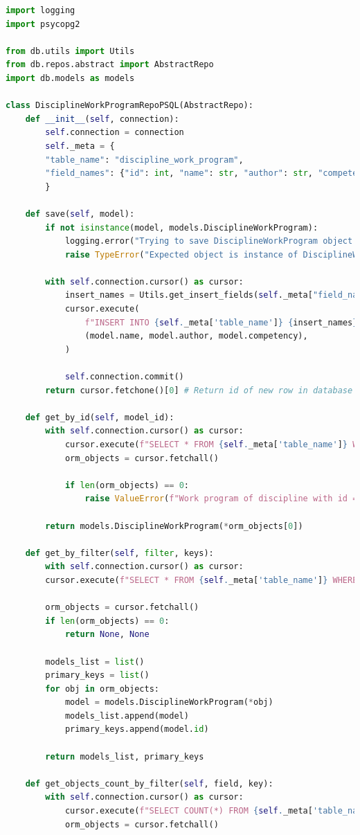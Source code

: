 \begin{lstlisting}[label=lst:db-postgresql, caption=Листинг модуля взаимодействия c СУБД PostgreSQL, language=python]
import logging
import psycopg2

from db.utils import Utils
from db.repos.abstract import AbstractRepo
import db.models as models

class DisciplineWorkProgramRepoPSQL(AbstractRepo):
	def __init__(self, connection):
		self.connection = connection
		self._meta = {
		"table_name": "discipline_work_program",
		"field_names": {"id": int, "name": str, "author": str, "competency": str}
		}
	
	def save(self, model):
		if not isinstance(model, models.DisciplineWorkProgram):
			logging.error("Trying to save DisciplineWorkProgram object of invalid type")
			raise TypeError("Expected object is instance of DisciplineWorkProgram")
	
		with self.connection.cursor() as cursor:
			insert_names = Utils.get_insert_fields(self._meta["field_names"])
			cursor.execute(
				f"INSERT INTO {self._meta['table_name']} {insert_names} VALUES (%s, %s, %s) RETURNING id",
				(model.name, model.author, model.competency),
			)
	
			self.connection.commit()
		return cursor.fetchone()[0] # Return id of new row in database
	
	def get_by_id(self, model_id):
		with self.connection.cursor() as cursor:
			cursor.execute(f"SELECT * FROM {self._meta['table_name']} WHERE id = %s", (model_id,))
			orm_objects = cursor.fetchall()
	
			if len(orm_objects) == 0:
				raise ValueError(f"Work program of discipline with id = {model_id} doesn't exists")
	
		return models.DisciplineWorkProgram(*orm_objects[0])
	
	def get_by_filter(self, filter, keys):
		with self.connection.cursor() as cursor:
		cursor.execute(f"SELECT * FROM {self._meta['table_name']} WHERE {filter}", keys)
	
		orm_objects = cursor.fetchall()
		if len(orm_objects) == 0:
			return None, None
	
		models_list = list()
		primary_keys = list()
		for obj in orm_objects:
			model = models.DisciplineWorkProgram(*obj)
			models_list.append(model)
			primary_keys.append(model.id)
	
		return models_list, primary_keys
	
	def get_objects_count_by_filter(self, field, key):
		with self.connection.cursor() as cursor:
			cursor.execute(f"SELECT COUNT(*) FROM {self._meta['table_name']} WHERE {field} = %s", (key,))
			orm_objects = cursor.fetchall()
	

\end{lstlisting}
